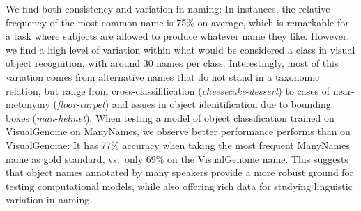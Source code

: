 We find both consistency and variation in naming: In instances, the relative frequency of the most common name is 75\% on average, which is remarkable for a task where subjects are allowed to produce whatever name they like.
However, 
we find a high level of variation within what would be considered a class in visual object recognition, with around 30 names per class.
Interestingly, most of this variation comes from alternative names that do not stand in a taxonomic relation, but range from 
cross-classifification  (\textit{cheesecake}-\textit{dessert}) to cases
of near-metonymy (\textit{floor}-\textit{carpet}) and issues in object idenitification due to bounding boxes (\textit{man}-\textit{helmet}).
When testing a model of object classification trained on VisualGenome on ManyNames, we observe  better performance performs than on VisualGenome: It has 77\% accuracy when taking the most frequent ManyNames name as gold standard, vs.\ only 69\% on the VisualGenome name.
This suggests that object names annotated by many speakers provide a more robust ground for testing computational models, while also offering rich data for studying linguistic variation in naming.



